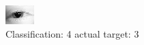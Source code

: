 \begin{figure}[h!]
\begin{center}
\includegraphics[width=0.60\columnwidth]{figures/ID132_class_4_target_3.png}
\end{center}
\caption{ Classification: 4 actual target: 3}
\label{fig:ID132_class_4_target_3}
\end{figure}
